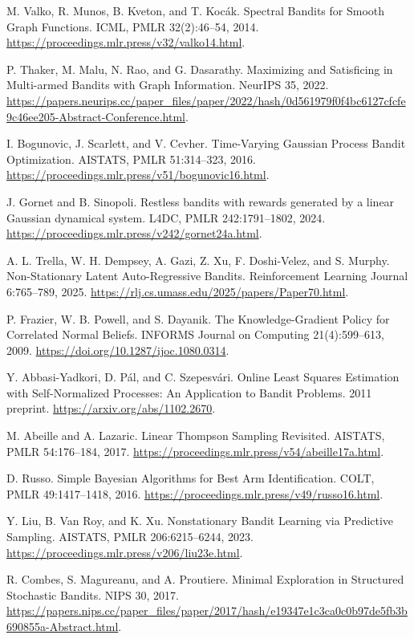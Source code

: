 M. Valko, R. Munos, B. Kveton, and T. Koc\'{a}k. Spectral Bandits for Smooth Graph Functions. ICML, PMLR 32(2):46--54, 2014. \url{https://proceedings.mlr.press/v32/valko14.html}.

P. Thaker, M. Malu, N. Rao, and G. Dasarathy. Maximizing and Satisficing in Multi-armed Bandits with Graph Information. NeurIPS 35, 2022. \url{https://papers.neurips.cc/paper_files/paper/2022/hash/0d561979f0f4bc6127cfcfe9c46ee205-Abstract-Conference.html}.

I. Bogunovic, J. Scarlett, and V. Cevher. Time-Varying Gaussian Process Bandit Optimization. AISTATS, PMLR 51:314--323, 2016. \url{https://proceedings.mlr.press/v51/bogunovic16.html}.

J. Gornet and B. Sinopoli. Restless bandits with rewards generated by a linear Gaussian dynamical system. L4DC, PMLR 242:1791--1802, 2024. \url{https://proceedings.mlr.press/v242/gornet24a.html}.

A. L. Trella, W. H. Dempsey, A. Gazi, Z. Xu, F. Doshi-Velez, and S. Murphy. Non-Stationary Latent Auto-Regressive Bandits. Reinforcement Learning Journal 6:765--789, 2025. \url{https://rlj.cs.umass.edu/2025/papers/Paper70.html}.

P. Frazier, W. B. Powell, and S. Dayanik. The Knowledge-Gradient Policy for Correlated Normal Beliefs. INFORMS Journal on Computing 21(4):599--613, 2009. \url{https://doi.org/10.1287/ijoc.1080.0314}.

Y. Abbasi-Yadkori, D. P\'{a}l, and C. Szepesv\'{a}ri. Online Least Squares Estimation with Self-Normalized Processes: An Application to Bandit Problems. 2011 preprint. \url{https://arxiv.org/abs/1102.2670}.

M. Abeille and A. Lazaric. Linear Thompson Sampling Revisited. AISTATS, PMLR 54:176--184, 2017. \url{https://proceedings.mlr.press/v54/abeille17a.html}.

D. Russo. Simple Bayesian Algorithms for Best Arm Identification. COLT, PMLR 49:1417--1418, 2016. \url{https://proceedings.mlr.press/v49/russo16.html}.

Y. Liu, B. Van Roy, and K. Xu. Nonstationary Bandit Learning via Predictive Sampling. AISTATS, PMLR 206:6215--6244, 2023. \url{https://proceedings.mlr.press/v206/liu23e.html}.

R. Combes, S. Magureanu, and A. Proutiere. Minimal Exploration in Structured Stochastic Bandits. NIPS 30, 2017. \url{https://papers.nips.cc/paper_files/paper/2017/hash/e19347e1c3ca0c0b97de5fb3b690855a-Abstract.html}.

